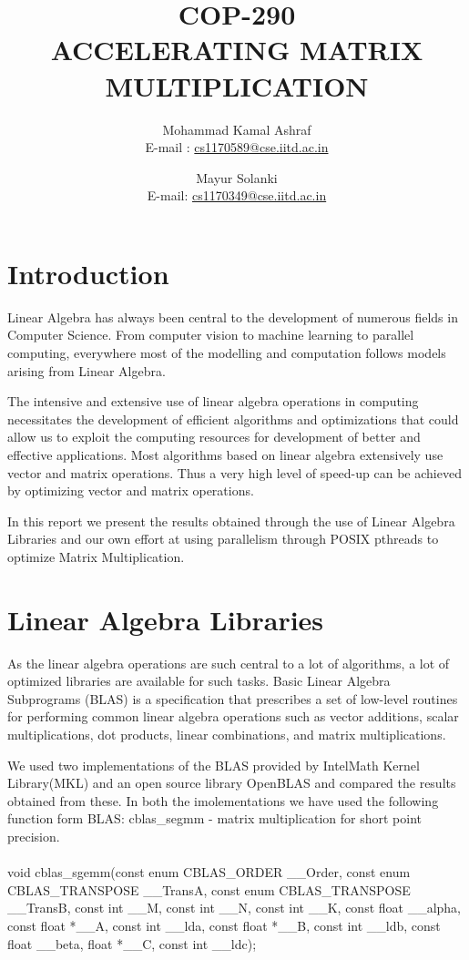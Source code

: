 \documentclass[10pt,a4paper,titlepage]{article}
\title{COP-290\\
	   ACCELERATING MATRIX MULTIPLICATION}
\author{Mohammad Kamal Ashraf \\E-mail : \href{mailto:cs1170589@cse.iitd.ac.in}{cs1170589@cse.iitd.ac.in}
\and	Mayur Solanki \\E-mail: \href{mailto:cs1170349@cse.iitd.ac.in}{cs1170349@cse.iitd.ac.in}
		}
\begin{document}
\maketitle
\section{Introduction}

Linear Algebra has always been central to the development of numerous fields in Computer Science. From computer vision to machine learning to parallel computing, everywhere most of the modelling and computation follows models arising from Linear Algebra. 

The intensive and extensive use of linear algebra operations in computing necessitates the development of efficient algorithms and optimizations that could allow us to exploit the computing resources for development of better and effective applications. Most algorithms based on linear algebra extensively use vector and matrix operations. Thus a very high level of speed-up can be achieved by optimizing vector and matrix operations.

In this report we present the results obtained through the use of Linear Algebra Libraries and our own effort at using parallelism through POSIX pthreads to optimize Matrix Multiplication.

\section{Linear Algebra Libraries}

As the linear algebra operations are such central to a lot of algorithms, a lot of optimized libraries are available for  such tasks. Basic Linear Algebra Subprograms (BLAS) is a specification that prescribes a set of low-level routines for performing common linear algebra operations such as vector additions, scalar multiplications, dot products, linear combinations, and matrix multiplications.

We used two implementations of the BLAS provided by Intel\circledR Math Kernel Library(MKL) and an open source library OpenBLAS and compared the results obtained from these. In both the imolementations we have used the following function form BLAS: cblas\_segmm - matrix multiplication for short point precision.\cite{BLASfunctions}
\\
\\
void cblas\_sgemm(const enum CBLAS\_ORDER \_\_Order, const enum CBLAS\_TRANSPOSE \_\_TransA, const enum CBLAS\_TRANSPOSE \_\_TransB, const int \_\_M, const int \_\_N, const int \_\_K, const float \_\_alpha, const float *\_\_A, const int \_\_lda, const float *\_\_B, const int \_\_ldb, const float \_\_beta, float *\_\_C, const int \_\_ldc);
\end{document}
